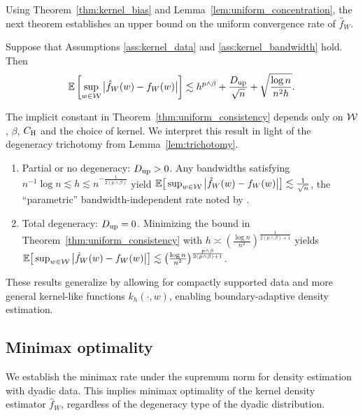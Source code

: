 Using Theorem~\ref{thm:kernel_bias} and Lemma~\ref{lem:uniform_concentration},
the next theorem establishes an upper bound on the uniform convergence rate of
$\hat f_W$.
%
\begin{theorem}%
  \label{thm:uniform_consistency}%
  Suppose that Assumptions \ref{ass:kernel_data} and
  \ref{ass:kernel_bandwidth} hold. Then
  \begin{align*}
    \mathbb{E}\left[
      \sup_{w \in \mathcal{W}}
      \big|\hat{f}_W(w) - f_W(w)\big|
    \right]
    \lesssim
    h^{p\wedge\beta} + \frac{D_{\textup{up}}}{\sqrt n} + \sqrt{\frac{\log n}{n^2h}}.
  \end{align*}
\end{theorem}
%
The implicit constant in Theorem~\ref{thm:uniform_consistency} depends only on
$\mathcal{W}$, $\beta$, $C_{\mathrm{H}}$ and the choice of kernel. We interpret this result in
light of the degeneracy trichotomy from Lemma~\ref{lem:trichotomy}.
%
\begin{enumerate}[label=(\roman*)]
  \item Partial or no degeneracy: $D_{\textup{up}} > 0$.
    Any bandwidths satisfying
    $n^{-1} \log n \lesssim h \lesssim n^{-\frac{1}{2(p\wedge\beta)}}$ yield
    $\mathbb{E}\big[\sup_{w \in \mathcal{W}}\big|\hat f_W(w)
    - f_W(w)\big| \big] \lesssim \frac{1}{\sqrt n}$, the ``parametric''
    bandwidth-independent rate noted by \citet{graham2022kernel}.

  \item Total degeneracy: $D_{\textup{up}} = 0$.
    Minimizing the bound in Theorem~\ref{thm:uniform_consistency} with
    $h \asymp \left( \frac{\log n}{n^2} \right)^{\frac{1}{2(p\wedge\beta)+1}}$
    yields $\mathbb{E}\big[ \sup_{w \in \mathcal{W}} \big|\hat f_W(w) - f_W(w)\big| \big]
    \lesssim
    \big(\frac{\log n}{n^2} \big)^{\frac{p\wedge\beta}{2(p\wedge\beta)+1}}$.
\end{enumerate}

These results generalize \citet*[Theorem~1]{chiang2020empirical}
by allowing for compactly supported data and more general kernel-like
functions $k_h(\cdot,w)$, enabling boundary-adaptive density estimation.

\subsection{Minimax optimality}

We establish the minimax rate under the supremum norm for density estimation
with dyadic data. This implies minimax optimality of the kernel density
estimator $\hat f_W$, regardless of the degeneracy type of the dyadic
distribution.

